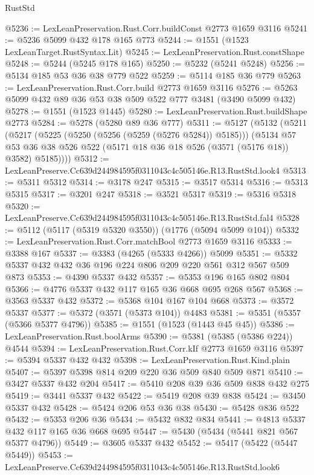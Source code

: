 \begin{lexlean}{RustStd}
\begin{coremodule}
@5236 := LexLeanPreservation.Rust.Corr.buildConst @2773 @1659 @3116
@5241 := @5236 @5099 @432 @178 @165 @773
@5244 := @1551 (@1523 LexLeanTarget.RustSyntax.Lit)
@5245 := LexLeanPreservation.Rust.constShape
@5248 := @5244 (@5245 @178 @165)
@5250 := @5232 (@5241 @5248)
@5256 := @5134 @185 @53 @36 @38 @779 @522
@5259 := @5114 @185 @36 @779
@5263 := LexLeanPreservation.Rust.Corr.build @2773 @1659 @3116
@5276 := @5263 @5099 @432 @89 @36 @53 @38 @509 @522 @777 @3481 (@3490 @5099 @432)
@5278 := @1551 (@1523 @1445)
@5280 := LexLeanPreservation.Rust.buildShape @2773
@5284 := @5278 (@5280 @89 @36 @777)
@5311 := @5127
    (@5132
      (@5211
        (@5217
          (@5225 (@5250 (@5256 (@5259 (@5276 @5284)) @5185)))
          (@5134
            @57
            @53
            @36
            @38
            @526
            @522
            (@5171 @18 @36 @18 @526 (@3571 (@5176 @18)) @3582)
            @5185))))
@5312 := LexLeanPreserve.Cc639d244984595f0311043c4c505146e.R13.RustStd.look4
@5313 := @5311 @5312
@5314 := @3178 @247
@5315 := @3517 @5314
@5316 := @5313 @5315
@5317 := @3201 @247
@5318 := @3521 @5317
@5319 := @5316 @5318
@5320 := LexLeanPreserve.Cc639d244984595f0311043c4c505146e.R13.RustStd.fal4
@5328 := @5112 (@5117 (@5319 @5320 @3550)) (@1776 (@5094 @5099 @104))
@5332 := LexLeanPreservation.Rust.Corr.matchBool @2773 @1659 @3116
@5333 := @3388 @167
@5337 := @3383 (@4265 (@5333 @4266)) @5099
@5351 := @5332 @5337 @432 @432 @36 @196 @224 @806 @209 @220 @561 @312 @567 @509 @873
@5353 := @4390 @5337 @432
@5357 := @5353 @196 @165 @802 @804
@5366 := @4776 @5337 @432 @117 @165 @36 @668 @695 @268 @567
@5368 := @3563 @5337 @432
@5372 := @5368 @104 @167 @104 @668
@5373 := @3572 @5337
@5377 := @5372 (@3571 (@5373 @104)) @4483
@5381 := @5351 (@5357 (@5366 @5377 @4796))
@5385 := @1551 (@1523 (@1443 @45 @45))
@5386 := LexLeanPreservation.Rust.boolArms
@5390 := @5381 (@5385 (@5386 @224)) @4544
@5394 := LexLeanPreservation.Rust.Corr.kIf @2773 @1659 @3116
@5397 := @5394 @5337 @432 @432
@5398 := LexLeanPreservation.Rust.Kind.plain
@5407 := @5397 @5398 @814 @209 @220 @36 @509 @840 @509 @871
@5410 := @3427 @5337 @432 @204
@5417 := @5410 @208 @39 @36 @509 @838 @432 @275
@5419 := @3441 @5337 @432
@5422 := @5419 @208 @39 @838
@5424 := @3450 @5337 @432
@5428 := @5424 @206 @53 @36 @38
@5430 := @5428 @836 @522
@5432 := @5353 @206 @36
@5434 := @5432 @832 @834
@5441 := @4813 @5337 @432 @117 @165 @36 @668 @695
@5447 := @5430 (@5434 (@5441 @821 @567 @5377 @4796))
@5449 := @3605 @5337 @432
@5452 := @5417 (@5422 (@5447 @5449))
@5453 := LexLeanPreserve.Cc639d244984595f0311043c4c505146e.R13.RustStd.look6

\end{coremodule}
\end{lexlean}
